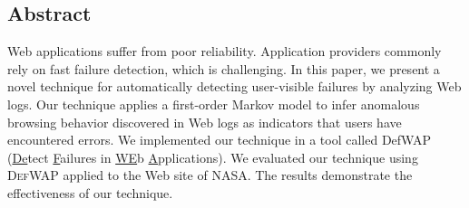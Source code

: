 \subsection*{Abstract}
Web applications suffer from poor reliability. Application providers commonly rely on fast failure detection, which is challenging. In this paper, we present a novel technique for automatically detecting user-visible failures by analyzing Web logs. Our technique applies a first-order Markov model to infer anomalous browsing behavior discovered in Web logs as indicators that users have encountered errors. We implemented our technique in a tool called {DefWAP} (\underline{De}tect \underline{F}ailures in \underline{WE}b \underline{A}pplications). We evaluated our technique using \textsc{DefWAP} applied to the Web site of NASA. The results demonstrate the effectiveness of our technique.

